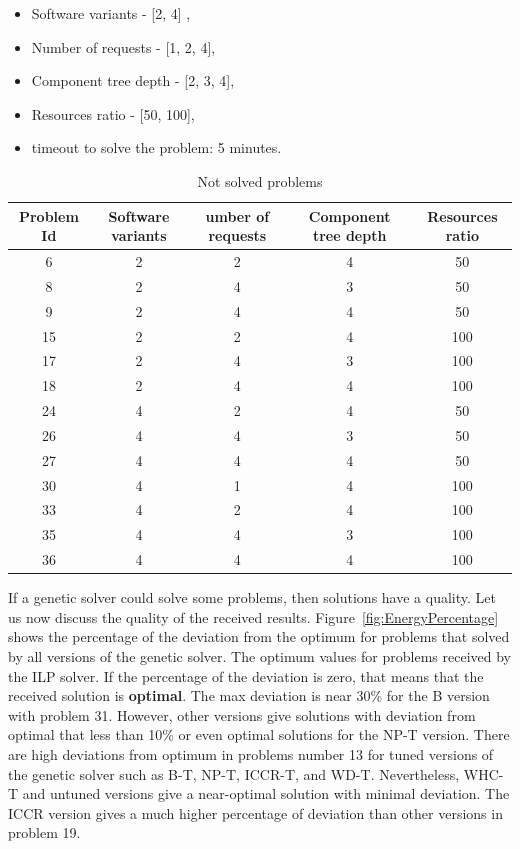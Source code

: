 \begin{itemize}
	\item Software variants - [2, 4] ,
	\item Number of requests - [1, 2, 4],
	\item Component tree depth - [2, 3, 4],
	\item Resources ratio - [50, 100],
	\item timeout to solve the problem: 5 minutes.
\end{itemize}

\begin{table}
	\centering
	\caption{Not solved problems}\label{tab:UnsolvedProblems}
		\begin{tabular}{c c c c c}
			\hline
			Problem Id & Software variants & umber of requests & Component tree depth & Resources ratio \\
			\hline            
			6 & 2 & 2 & 4 & 50 \\
			8 & 2 & 4 & 3 & 50 \\
			9 & 2 & 4 & 4 & 50 \\
			15 & 2 & 2 & 4 & 100 \\
			17 & 2 & 4 & 3 & 100 \\
			18 & 2 & 4 & 4 & 100 \\
			24 & 4 & 2 & 4 & 50 \\
			26 & 4 & 4 & 3 & 50 \\
			27 & 4 & 4 & 4 & 50 \\
			30 & 4 & 1 & 4 & 100 \\
			33 & 4 & 2 & 4 & 100 \\
			35 & 4 & 4 & 3 & 100 \\
			36 & 4 & 4 & 4 & 100 \\
			\hline
		\end{tabular}
\end{table}

If a genetic solver could solve some problems, then solutions have a quality.
Let us now discuss the quality of the received results. Figure~\ref{fig:EnergyPercentage} shows the percentage of the deviation from the optimum for problems that solved by all versions of the genetic solver. The optimum values for problems received by the ILP solver. If the percentage of the deviation is zero, that means that the received solution is \textbf{optimal}. The max deviation is near 30\% for the B version with problem 31. However, other versions give solutions with deviation from optimal that less than 10\% or even optimal solutions for the NP-T version. There are high deviations from optimum in problems number 13 for tuned versions of the genetic solver such as B-T, NP-T, ICCR-T, and WD-T. Nevertheless, WHC-T and untuned versions give a near-optimal solution with minimal deviation. The ICCR version gives a much higher percentage of deviation than other versions in problem 19.

